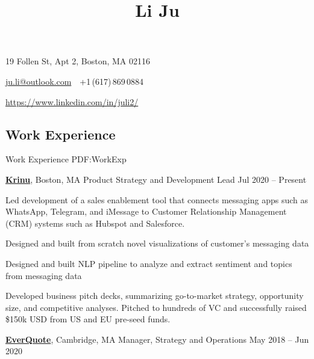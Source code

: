 \documentclass[letterpaper,10pt,oneside]{article}
\newcommand{\CVAuthor}{Li Ju}
\begin{document}

\title{\CVAuthor}

\begin{subtitle}
\vspace{0.7em}
19 Follen St, Apt 2, Boston, MA 02116
\par
\href{mailto:ju.li@outlook.com}
{ju.li@outlook.com}
\,\SubBulletSymbol\,
+1\,(617)\,869\,0884
\par 
\href{https://www.linkedin.com/in/juli2/}{https://www.linkedin.com/in/juli2/}
\end{subtitle}

\begin{body}


\section
{Work\newline
Experience}
{Work Experience}
{PDF:WorkExp}

\href{https://krinu.com/}
{\textbf{Krinu}},
Boston, MA 
\GapNoBreak
Product Strategy and Development Lead
\hfill
Jul 2020 -- Present
\begin{flushleft}

\BulletItem Led development of a sales enablement tool that connects messaging apps such as WhatsApp, Telegram, and iMessage to Customer Relationship Management (CRM) systems such as Hubspot and Salesforce. 

\vspace{0.3em} \SubBulletItem Designed and built from scratch novel visualizations of customer's messaging data

\vspace{0.3em} \SubBulletItem Designed and built NLP pipeline to analyze and extract sentiment and topics from messaging data

\vspace{0.75em}
\BulletItem Developed business pitch decks, summarizing go-to-market strategy, opportunity size, and competitive analyses. Pitched to hundreds of VC and successfully raised \$150k USD from US and EU pre-seed funds. 

\end{flushleft}


\href{http://www.everquote.com/}
{\textbf{EverQuote}},
Cambridge, MA
\GapNoBreak
Manager, Strategy and Operations
\hfill
May 2018 -- Jun 2020
\begin{flushleft}


\end{flushleft}
\end{body}
\end{document}

